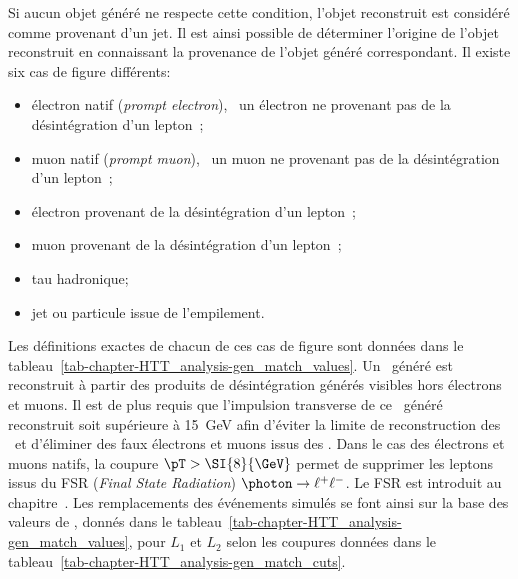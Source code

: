Si aucun objet généré ne respecte cette condition, l'objet reconstruit est considéré comme provenant d'un jet.
Il est ainsi possible de déterminer l'origine de l'objet reconstruit en connaissant la provenance de l'objet généré correspondant.
Il existe six cas de figure différents:
\begin{itemize}
\item électron natif (\emph{prompt electron}), \ie\ un électron ne provenant pas de la désintégration d'un lepton~\tau;
\item muon natif (\emph{prompt muon}), \ie\ un muon ne provenant pas de la désintégration d'un lepton~\tau;
\item électron provenant de la désintégration d'un lepton~\tau;
\item muon provenant de la désintégration d'un lepton~\tau;
\item tau hadronique;
\item jet ou particule issue de l'empilement.
\end{itemize}
Les définitions exactes de chacun de ces cas de figure sont données dans le tableau~\ref{tab-chapter-HTT_analysis-gen_match_values}.
Un \tauh\ généré est reconstruit à partir des produits de désintégration générés visibles hors électrons et muons.
Il est de plus requis que l'impulsion transverse de ce \tauh\ généré reconstruit soit supérieure à \SI{15}{\GeV} afin d'éviter la limite de reconstruction des \tauh\ et d'éliminer des faux électrons et muons issus des \tauh.
Dans le cas des électrons et muons natifs, la coupure $\pT > \SI{8}{\GeV}$ permet de supprimer les leptons issus du FSR (\emph{Final State Radiation}) $\photon\to\ell^+\ell^-$.
Le FSR est introduit au chapitre~.
Les remplacements des événements simulés se font ainsi sur la base des valeurs de , donnés dans le tableau~\ref{tab-chapter-HTT_analysis-gen_match_values}, pour $L_1$ et $L_2$ selon les coupures données dans le tableau~\ref{tab-chapter-HTT_analysis-gen_match_cuts}.
